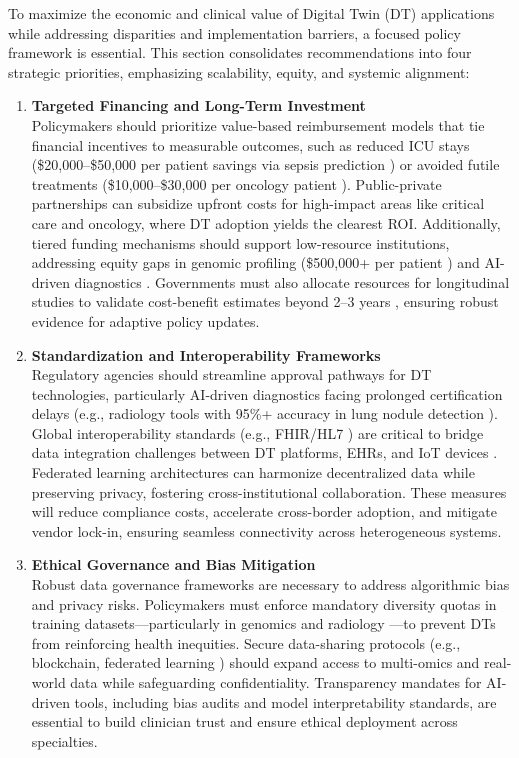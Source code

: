 \documentclass[10pt,a4paper]{article}
\begin{document}
To maximize the economic and clinical value of Digital Twin (DT) applications while addressing disparities and implementation barriers, a focused policy framework is essential. This section consolidates recommendations into four strategic priorities, emphasizing scalability, equity, and systemic alignment:

\begin{enumerate}
    \item \textbf{Targeted Financing and Long-Term Investment} \\
    Policymakers should prioritize value-based reimbursement models that tie financial incentives to measurable outcomes, such as reduced ICU stays (\$20,000–\$50,000 per patient savings via sepsis prediction \cite{Mascret2024}) or avoided futile treatments (\$10,000–\$30,000 per oncology patient \cite{Wang2025}). Public-private partnerships can subsidize upfront costs for high-impact areas like critical care and oncology, where DT adoption yields the clearest ROI. Additionally, tiered funding mechanisms should support low-resource institutions, addressing equity gaps in genomic profiling (\$500,000+ per patient \cite{Wang2025}) and AI-driven diagnostics \cite{Bocean2025}. Governments must also allocate resources for longitudinal studies to validate cost-benefit estimates beyond 2–3 years \cite{Mascret2024}, ensuring robust evidence for adaptive policy updates.

    \item \textbf{Standardization and Interoperability Frameworks} \\
    Regulatory agencies should streamline approval pathways for DT technologies, particularly AI-driven diagnostics facing prolonged certification delays (e.g., radiology tools with 95\%+ accuracy in lung nodule detection \cite{Bocean2025}). Global interoperability standards (e.g., FHIR/HL7 \cite{Ahmed2023}) are critical to bridge data integration challenges between DT platforms, EHRs, and IoT devices \cite{Mascret2024}. Federated learning architectures \cite{Boverhof2024} can harmonize decentralized data while preserving privacy, fostering cross-institutional collaboration. These measures will reduce compliance costs, accelerate cross-border adoption, and mitigate vendor lock-in, ensuring seamless connectivity across heterogeneous systems.

    \item \textbf{Ethical Governance and Bias Mitigation} \\
    Robust data governance frameworks are necessary to address algorithmic bias and privacy risks. Policymakers must enforce mandatory diversity quotas in training datasets—particularly in genomics \cite{Wang2025} and radiology \cite{Bocean2025}—to prevent DTs from reinforcing health inequities. Secure data-sharing protocols (e.g., blockchain, federated learning \cite{Boverhof2024}) should expand access to multi-omics and real-world data while safeguarding confidentiality. Transparency mandates for AI-driven tools, including bias audits and model interpretability standards, are essential to build clinician trust and ensure ethical deployment across specialties.


\end{enumerate}
\end{document}
